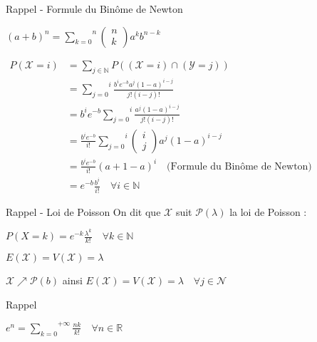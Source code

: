 \documentclass[a4paper, 12pt]{article}
\begin{document}
\begin{rappel}{Rappel - Formule du Binôme de Newton}
{
\Large
\begin{center}
$(a + b)^n = \overset{n}{\underset{k = 0}{\sum}} \left ( \begin{array}{c} n \\ k \end{array} \right ) a^k b^{n - k}$
\end{center}
}
\end{rappel}

$
\begin{aligned}
P (\mathcal{X} = i) &= \underset{j \in \mathbb{N}}{\sum} P ((\mathcal{X} = i) \cap (\mathcal{Y} = j)) \\
&= \overset{i}{\underset{j = 0}{\sum}} \frac{b^i e^{-b} a^j (1 - a)^{i - j}}{j! (i - j)!} \\
&= b^i e^{-b} \overset{i}{\underset{j = 0}{\sum}} \frac{a^j (1 - a)^{i - j}}{j! (i - j)!} \\
&= \frac{b^i e^{-b}}{i!}  \overset{i}{\underset{j = 0}{\sum}} \left ( \begin{array}{c} i \\ j \end{array} \right ) a^j (1 - a)^{i - j} \\
&= \frac{b^i e^{-b}}{i!} (a + 1 - a)^i \quad \text{(Formule du Binôme de Newton)} \\
&\boxed{= e^{-b} \frac{b^i}{i!} \quad \forall i \in \mathbb{N}}
\end{aligned}
$ \\

\begin{rappel}{Rappel - Loi de Poisson}
On dit que $\mathcal{X}$ suit $\mathcal{P} (\lambda)$ la loi de Poisson :
{
\Large
\begin{center}
$\boxed{P (X = k) = e^{-k} \frac{\lambda^k}{k!} \quad \forall k \in \mathbb{N}}$ \\
\end{center}
}
$E(\mathcal{X}) = V(\mathcal{X}) = \lambda$
\end{rappel}

$\mathcal{X} \nearrow \mathcal{P} (b)$ ainsi $E(\mathcal{X}) = V(\mathcal{X}) = \lambda \quad \forall j \in \mathcal{N}$ \\

\begin{rappel}{Rappel}
{
\Large
\begin{center}
$e^n = \overset{+\infty}{\underset{k = 0}{\sum}} \frac{nk}{k!} \quad \forall n \in \mathbb{R}$
\end{center}
}
\end{rappel}
\end{document}
